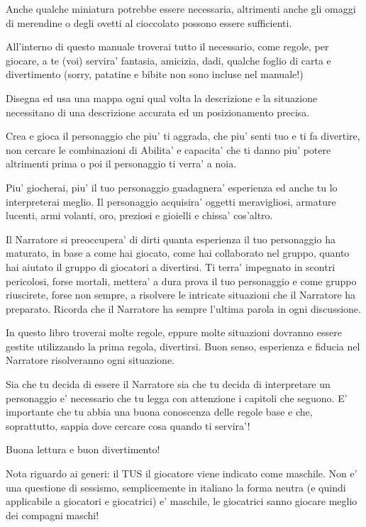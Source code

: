 \documentclass[a4paper,11pt,twoside,openany]{book}
\begin{document}
	Anche qualche miniatura potrebbe essere necessaria, altrimenti anche gli omaggi di merendine o degli ovetti al cioccolato possono essere sufficienti.
	
	All'interno di questo manuale troverai tutto il necessario, come regole, per giocare, a te (voi) servira' fantasia, amicizia, dadi, qualche foglio di carta e divertimento (sorry, patatine e bibite non sono incluse nel manuale!)
	
	Disegna ed usa una mappa ogni qual volta la descrizione e la situazione necessitano di una descrizione accurata ed un posizionamento precisa. 
	
	Crea e gioca il personaggio che piu' ti aggrada, che piu' senti tuo e ti fa divertire, non cercare le combinazioni di Abilita' e capacita' che ti danno piu' potere altrimenti prima o poi il personaggio ti verra' a noia.
	
	Piu' giocherai, piu' il tuo personaggio guadagnera' esperienza ed anche tu lo interpreterai meglio. Il personaggio acquisira' oggetti meravigliosi, armature lucenti, armi volanti, oro, preziosi e gioielli e chissa' cos'altro.
	
	Il Narratore si preoccupera' di dirti quanta esperienza il tuo personaggio ha maturato, in base a come hai giocato, come hai collaborato nel gruppo, quanto hai aiutato il gruppo di giocatori a divertirsi. Ti terra' impegnato in scontri pericolosi, forse mortali, mettera' a dura prova il tuo personaggio e come gruppo riuscirete, forse non sempre, a risolvere le intricate situazioni che il Narratore ha preparato. Ricorda che il Narratore ha sempre l'ultima parola in ogni discussione.
	
	In questo libro troverai molte regole, eppure molte situazioni dovranno essere gestite utilizzando la prima regola, divertirsi. Buon senso, esperienza e fiducia nel Narratore risolveranno ogni situazione.
	
	Sia che tu decida di essere il Narratore sia che tu decida di interpretare un personaggio e' necessario che tu legga con attenzione i capitoli che seguono.
	E' importante che tu abbia una buona conoscenza delle regole base e che, soprattutto, sappia dove cercare cosa quando ti servira'!
	
	Buona lettura e buon divertimento!
	
	Nota riguardo ai generi: il TUS il giocatore viene indicato come maschile. Non e' una questione di sessismo, semplicemente in italiano la forma neutra (e quindi applicabile a giocatori e giocatrici) e' maschile, le giocatrici sanno giocare meglio dei compagni maschi!
	
\end{document}

